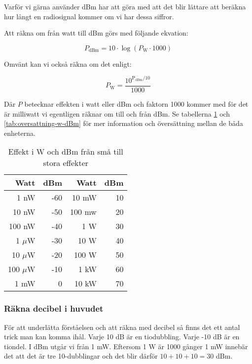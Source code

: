 \documentclass[12ypt,swedish,a4paper]{report}
\begin{document}
Varför vi gärna använder dBm har att göra med att det blir lättare att beräkna hur långt en radiosignal kommer om vi har dessa siffror. 

Att räkna om från watt till dBm görs med följande ekvation:

\begin{equation}
P_{\mathrm{dBm}}=10\cdot\log(P_{\mathrm{W}}\cdot 1000)
\end{equation}

Omvänt kan vi också räkna om det enligt:

\begin{equation}
P_{\mathrm{W}}=\frac{10^{\mathrm{P_{dBm}}/10}}{1000}
\end{equation}

Där $P$ betecknar effekten i watt eller dBm och faktorn 1000 kommer med för det är milliwatt vi egentligen räknar om till och från dBm. Se tabellerna \ref{tab:effekt-dbm} och \ref{tab:oversattning-w-dBm} för mer information och översättning mellan de båda enheterna.

\begin{table}[!h]
	\centering
 	\begin{tabular}{rr|rr}
	      Watt & dBm &   Watt & dBm \\ \hline
	      1 nW & -60 &  10 mW &  10 \\
	     10 nW & -50 & 100 mw &  20 \\
	    100 nW & -40 &    1 W &  30 \\
	  1 $\mu$W & -30 &   10 W &  40 \\
	 10 $\mu$W & -20 &  100 W &  50 \\
	100 $\mu$W & -10 &   1 kW &  60 \\
	      1 mW &   0 &  10 kW &  70
	\end{tabular}
	\caption{Effekt i W och dBm från små till stora effekter}
	\label{tab:effekt-dbm}
\end{table}


\subsubsection{Räkna decibel i huvudet}

För att underlätta förståelsen och att räkna med decibel så finns det ett antal trick man kan komma ihål. Varje 10 dB är en tiodubbling. Varje -10 dB är en tiondel. I dBm utgår vi från 1 mW. Eftersom 1 W är 1000 gånger 1 mW innebär det att det är tre 10-dubblingar och det blir därför $10+10+10=30$ dBm.
\end{document}
